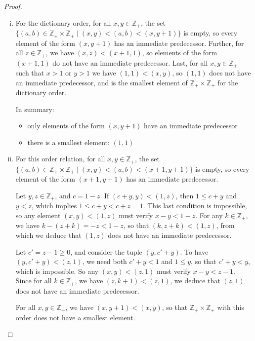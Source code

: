\documentclass[11pt,a4paper,twoside]{article}
\theoremstyle{definition}
\begin{document}
\begin{proof}\hfill

  \begin{enumerate}[(i)]

  \item For the dictionary order, for all $x, y \in \mathbb{Z}_+$, the set $\{ (a, b) \in \mathbb{Z}_+ \times \mathbb{Z}_+ \mid (x, y) < (a, b) < (x, y + 1) \}$ is empty,
    so every element of the form $(x, y + 1)$ has an immediate predecessor. Further, for all $z \in \mathbb{Z}_+$, we have $(x, z) < (x + 1, 1)$,
    so elements of the form $(x + 1, 1)$ do not have an immediate predecessor. Last, for all $x, y \in \mathbb{Z}_+$ such that $x > 1$ or $y > 1$ we have $(1, 1) < (x, y)$,
    so $(1, 1)$ does not have an immediate predecessor, and is the smallest element of $\mathbb{Z}_+ \times \mathbb{Z}_+$ for the dictionary order.

    In summary:
    \begin{itemize}
    \item only elements of the form $(x, y + 1)$ have an immediate predecessor
    \item there is a smallest element: $(1, 1)$
    \end{itemize}

  \item For this order relation, for all $x, y \in \mathbb{Z}_+$, the set $\{ (a, b) \in \mathbb{Z}_+ \times \mathbb{Z}_+ \mid (x, y) < (a, b) < (x + 1, y + 1) \}$ is empty,
    so every element of the form $(x + 1, y + 1)$ has an immediate predecessor.

    Let $y, z \in \mathbb{Z}_+$, and $c = 1 - z$. If $(c + y, y) < (1, z)$, then $1 \leq c + y$ and $y < z$,
    which implies $1 \leq c + y < c + z = 1$. This last condition is impossible, so any element $(x, y) < (1, z)$ must verify $x - y < 1 - z$.
    For any $k \in \mathbb{Z}_+$, we have $k - (z + k) = -z < 1 - z$, so that $(k, z + k) < (1, z)$, from which we deduce that $(1, z)$ does not have an immediate predecessor.

    Let $c' = z - 1 \geq 0$, and consider the tuple $(y, c' + y)$. To have $(y, c' + y) < (z, 1)$, we need both $c' + y < 1$ and $1 \leq y$, so that $c' + y < y$, which is impossible.
    So any $(x, y) < (z, 1)$ must verify $x - y < z - 1$. Since for all $k \in \mathbb{Z}_+$, we have $(z, k + 1) < (z, 1)$, we deduce that $(z, 1)$ does not have an immediate predecessor.

    For all $x, y \in \mathbb{Z}_+$, we have $(x, y + 1) < (x, y)$, so that $\mathbb{Z}_+ \times \mathbb{Z}_+$ with this order does not have a smallest element.


\end{enumerate}
\end{proof}
\end{document}
